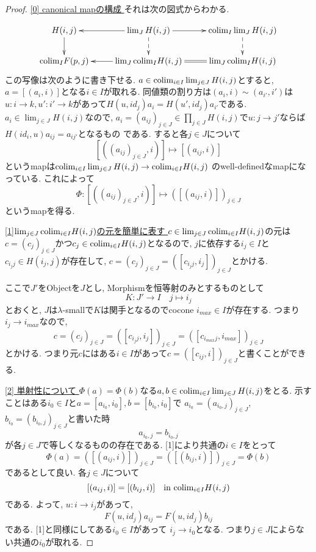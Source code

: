 \documentclass[dvipdfmx,a4paper,11pt]{article}
\newcommand{\colim}{{\rm colim}}
\theoremstyle{definition}
\begin{document}
\begin{proof}

\underline{[0] canonical mapの構成 }
それは次の図式からわかる. 

\begin{equation*}
\xymatrix@C=25pt@R=20pt{
H(i,j)\ar@{->}[d]
& \lim_{J} H(i,j)\ar@{-->}[d]\ar@{->}[l]\ar@{->}[r]
&\colim_{I}\lim_{J} H(i,j)\ar@{-->}[d]
\\
\colim_{I}F(p,j)
&\lim_{J}\colim_{I}H(i,j)\ar@{->}[l]
&\lim_{J}\colim_{I}H(i,j)\ar@{=}[l] \\   
}
\end{equation*}
この写像は次のように書き下せる.
$a \in \colim_{i \in I} \lim_{j \in J}H(i,j)$とすると, $a = [(a_i, i)]$となる$i \in I$が取れる.
同値類の割り方は$(a_i, i) \sim (a_{i'}, i')$は$u : i \to k, u' : i' \to k$があって$H(u, id_{j})a_i = H(u', id_{j})a_{i'}$である.
$a_i \in \lim_{j \in J}H(i,j)$なので, 
$a_i =(a_{ij})_{j \in J} \in \prod_{j \in J}H(i,j)$で$u : j \to j'$ならば$H(id_{i}, u)a_{ij} = a_{ij'}$となるもの
である.
すると各$j \in J$について
$$
[((a_{ij})_{j \in J} , i)] \mapsto [(a_{ij}, i)]
$$
というmapは$\colim_{i \in I} \lim_{j \in J}H(i,j) \to \colim_{i \in I} H(i,j)$
のwell-definedなmapになっている. これによって
$$
\Phi : [((a_{ij})_{j \in J} , i)] \mapsto ([(a_{ij}, i)])_{j \in J}
$$
というmapを得る. 

\underline{[1]$\lim_{j \in J}\colim_{i \in I} H(i,j)$の元を簡単に表す } 
$c \in \lim_{j \in J}\colim_{i \in I} H(i,j)$の元は
$c = (c_j)_{j \in J}$かつ$c_j \in \colim_{i \in I} H(i,j)$となるので, 
$j$に依存する$i_{j} \in I$と$c_{i_{j}j} \in H(i_{j},j)$が存在して, 
$c = (c_j)_{j \in J}=([c_{i_{j}j}, i_{j}])_{j \in J}$とかける. 

ここで$J'$をObjectを$J$とし, Morphismを恒等射のみとするものとして
$$
K : J' \to I \quad j \mapsto i_{j}
$$
とおくと, $J$は$\lambda$-smallで$K$は関手となるのでcocone $i_{max} \in I$が存在する.
つまり$i_j \to i_{max}$なので,
 $$
 c = (c_j)_{j \in J}=([c_{i_{j}j}, i_{j}])_{j \in J}
 =([c_{i_{max}j}, i_{max}])_{j \in J}
 $$
 とかける. 
 つまり元$c$にはある$i \in I$があって$c= ([c_{ij}, i])_{j \in J}$と書くことができる. 
 

\underline{[2] 単射性について }
$\Phi(a)=\Phi(b)$なる$a, b \in \colim_{i \in I} \lim_{j \in J}H(i,j)$をとる. 
示すことはある$i_0 \in I$と$a =[a_{i_0}, i_0], b =[b_{i_0}, i_0]$で
$a_{i_0} = (a_{i_{0},j})_{j \in J}$, $b_{i_0} = (b_{i_{0},j})_{j \in J}$と書いた時
$$
a_{i_{0},j} = b_{i_{0},j}
$$
が各$j \in J$で等しくなるものの存在である. 
[1]により共通の$i \in I$をとって
$$
\Phi(a) = ([(a_{ij}, i)])_{j \in J} = ([(b_{ij}, i)])_{j \in J} = \Phi(b)$$
であるとして良い. 
各$j \in J$について
$$
[(a_{ij}, i)] = [(b_{ij}, i)] \quad \text{in $\colim_{i \in I} H(i,j)$}
$$
である. 
よって, $u : i \to i_{j}$があって, 
$$
F(u, id_{j})a_{ij} = F(u, id_{j})b_{ij}
$$
である. [1]と同様にしてある$i_{0} \in I$があって
$i_{j} \to i_{0}$となる.
つまり$j \in J$によらない共通の$i_{0}$が取れる.


\end{proof}
\end{document}
